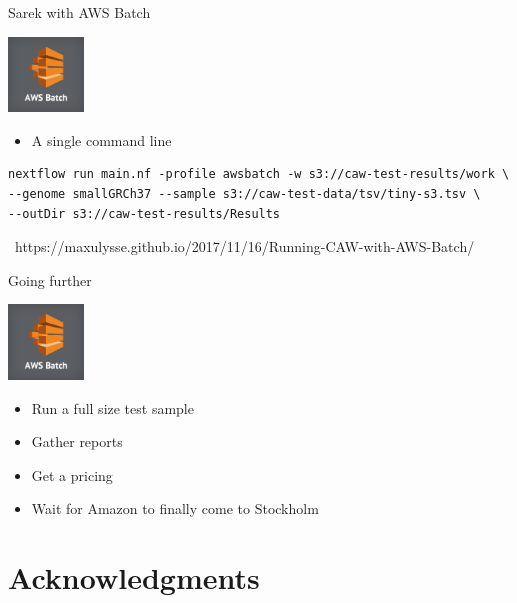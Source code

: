 \documentclass{beamer}
\begin{document}
\begin{frame}[fragile]{Sarek with AWS Batch}
	\begin{center}
		\includegraphics[height=2cm]{pictures/Batch.png}
	\end{center}
	\pause
	\begin{itemize}
		\item A single command line
	\end{itemize}
	\begin{verbatim}
nextflow run main.nf -profile awsbatch -w s3://caw-test-results/work \
--genome smallGRCh37 --sample s3://caw-test-data/tsv/tiny-s3.tsv \
--outDir s3://caw-test-results/Results
	\end{verbatim}
	\pause
	\footnotesize
	\faGlobe\ https://maxulysse.github.io/2017/11/16/Running-CAW-with-AWS-Batch/
\end{frame}

\begin{frame}{Going further}
	\begin{center}
		\includegraphics[height=2cm]{pictures/Batch.png}
	\end{center}
	\begin{itemize}
		\item Run a full size test sample
		\pause
		\item Gather reports
		\pause
		\item Get a pricing
		\pause
		\item Wait for Amazon to finally come to Stockholm
	\end{itemize}
\end{frame}

\section{Acknowledgments}
\end{document}
